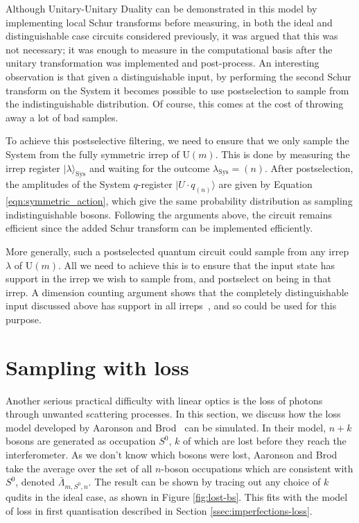Although Unitary-Unitary Duality can be demonstrated in this model by implementing local Schur transforms before measuring, in both the ideal and distinguishable case circuits considered previously, it was argued that this was not necessary; it was enough to measure in the computational basis after the unitary transformation was implemented and post-process.
An interesting observation is that given a distinguishable input, by performing the second Schur transform on the System it becomes possible to use postselection to sample from the indistinguishable distribution.
Of course, this comes at the cost of throwing away a lot of bad samples.

To achieve this postselective filtering, we need to ensure that we only sample the System from the fully symmetric irrep of $\textrm{U}(m)$. 
This is done by measuring the irrep register $|\lambda\rangle_{\textrm{Sys}}$ and waiting for the outcome $\lambda_{\textrm{Sys}}=(n)$. 
After postselection, the amplitudes of the System $q$-register $|U\cdot q_{(n)}\rangle$ are given by Equation \ref{eqn:symmetric_action}, which give the same probability distribution as sampling indistinguishable bosons. 
Following the arguments above, the circuit remains efficient since the added Schur transform can be implemented efficiently. 

More generally, such a postselected quantum circuit could sample from any irrep $\lambda$ of $\textrm{U}(m)$. 
All we need to achieve this is to ensure that the input state has support in the irrep we wish to sample from, and postselect on being in that irrep.
A dimension counting argument shows that the completely distinguishable input discussed above has support in all irreps~\cite{stanisic2018}, and so could be used for this purpose.



\section{Sampling with loss}
\label{sec:nc-loss}

Another serious practical difficulty with linear optics is the loss of photons through unwanted scattering processes. 
In this section, we discuss how the loss model developed by Aaronson and Brod~\cite{aaronson2016} can be simulated. 
In their model, $n+k$ bosons are generated as occupation $S^0$, $k$ of which are lost before they reach the interferometer. 
As we don't know which bosons were lost, Aaronson and Brod take the average over the set of all $n$-boson occupations which are consistent with $S^0$, denoted $\bar{\Lambda}_{m,S^0,n}$.
The result can be shown by tracing out any choice of $k$ qudits in the ideal case, as shown in Figure \ref{fig:lost-bs}. This fits with the model of loss in first quantisation described in Section \ref{ssec:imperfections-loss}.


